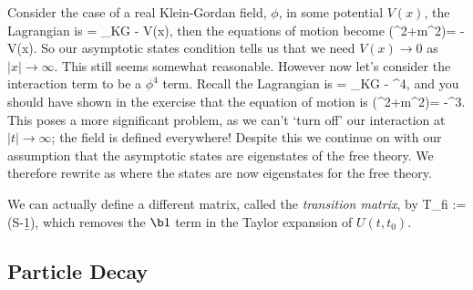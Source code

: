 Consider the case of a real Klein-Gordan field, $\phi$, in some potential $V(x)$, the Lagrangian is 
\bse 
    \cL = \cL_{KG} - V(x)\phi,
\ese 
then the equations of motion become 
\bse 
    (\p^2+m^2)\phi = -V(x).
\ese 
So our asymptotic states condition tells us that we need $V(x)\to 0$ as $|x|\to\infty$. This still seems somewhat reasonable. However now let's consider the interaction term to be a $\phi^4$ term. Recall the Lagrangian is 
\bse 
    \cL = \cL_{KG} - \phi^4,
\ese
and you should have shown in the exercise that the equation of motion is
\bse 
    (\p^2+m^2)\phi = -\phi^3.
\ese 
This poses a more significant problem, as we can't `turn off' our interaction at $|t|\to\infty$; the field is defined everywhere! Despite this we continue on with our assumption that the asymptotic states are eigenstates of the free theory. We therefore rewrite  as
\noindent where the states are now eigenstates for the free theory.

We can actually define a different matrix, called the \textit{transition matrix}, by 
\bse 
    T_{fi} := (S-\b1),
\ese 
which removes the $\b1$ term in the Taylor expansion of $U(t,t_0)$.

\subsection{Particle Decay}

